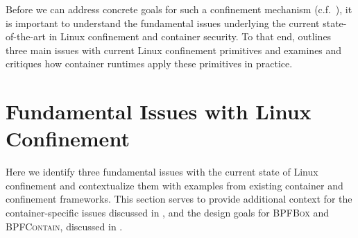 \documentclass[
  fontsize=12pt,
  titlepage=firstiscover,
  paper=letter,
oneside,
  cleardoublepage=plain,
  parskip=half-,
  DIV=10,
  parindent,
  appendixprefix,
  chapterprefix,
  listof=totoc,
]{scrbook}
\newcommand{\bpfbox}{\textsc{BPFBox}}
\newcommand{\bpfcontain}{\textsc{BPFContain}}
\begin{document}
Before we can address concrete goals for such a confinement mechanism
(c.f.\ ), it is important to understand the fundamental
issues underlying the current state-of-the-art in Linux confinement and container
security. To that end,  outlines three main issues with current Linux
confinement primitives and  examines and critiques how container
runtimes apply these primitives in practice.














\section{Fundamental Issues with Linux Confinement}\label{s:cp-issues}

Here we identify three fundamental issues with the current state of Linux confinement and
contextualize them with examples from existing container and confinement frameworks. This
section serves to provide additional context for the container-specific issues discussed
in , and the design goals for \bpfbox{} and \bpfcontain{}, discussed
in .
\end{document}
